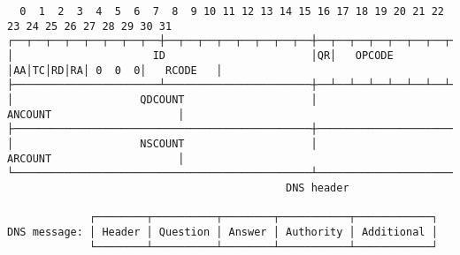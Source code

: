 \documentclass[varwidth=50cm,crop]{standalone}
\begin{document}
\begin{verbatim}
  0  1  2  3  4  5  6  7  8  9 10 11 12 13 14 15 16 17 18 19 20 21 22 23 24 25 26 27 28 29 30 31
┌──┬──┬──┬──┬──┬──┬──┬──┼──┬──┬──┬──┬──┬──┬──┬──┼──┬──┬──┬──┬──┬──┬──┬──┼──┬──┬──┬──┬──┬──┬──┬──┤
│                      ID                       │QR│   OPCODE  │AA│TC│RD│RA│ 0  0  0│   RCODE   │ 
├───────────────────────┴───────────────────────┼──┴──┴──┴──┴──┴──┴──┴──┴──┴──┴──┴──┴──┴──┴──┴──┤
│                    QDCOUNT                    │                    ANCOUNT                    │
├───────────────────────────────────────────────┼───────────────────────────────────────────────┤
│                    NSCOUNT                    │                    ARCOUNT                    │
└───────────────────────────────────────────────┴───────────────────────────────────────────────┘
                                            DNS header                    

             ┌────────┬──────────┬────────┬───────────┬────────────┐
DNS message: │ Header │ Question │ Answer │ Authority │ Additional │ 
             └────────┴──────────┴────────┴───────────┴────────────┘
\end{verbatim}
\end{document}

